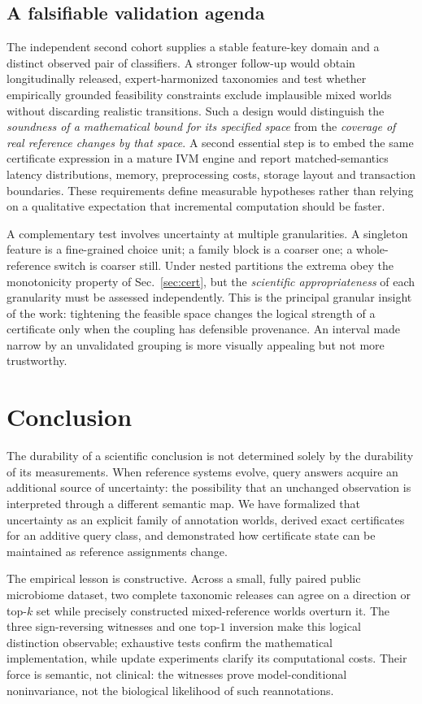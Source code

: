\documentclass[conference]{IEEEtran}
\begin{document}
\subsection{A falsifiable validation agenda}
The independent second cohort supplies a stable feature-key domain and a distinct observed pair of classifiers. A stronger follow-up would obtain longitudinally released, expert-harmonized taxonomies and test whether empirically grounded feasibility constraints exclude implausible mixed worlds without discarding realistic transitions. Such a design would distinguish the \emph{soundness of a mathematical bound for its specified space} from the \emph{coverage of real reference changes by that space}. A second essential step is to embed the same certificate expression in a mature IVM engine and report matched-semantics latency distributions, memory, preprocessing costs, storage layout and transaction boundaries. These requirements define measurable hypotheses rather than relying on a qualitative expectation that incremental computation should be faster.

A complementary test involves uncertainty at multiple granularities. A singleton feature is a fine-grained choice unit; a family block is a coarser one; a whole-reference switch is coarser still. Under nested partitions the extrema obey the monotonicity property of Sec.~\ref{sec:cert}, but the \emph{scientific appropriateness} of each granularity must be assessed independently. This is the principal granular insight of the work: tightening the feasible space changes the logical strength of a certificate only when the coupling has defensible provenance. An interval made narrow by an unvalidated grouping is more visually appealing but not more trustworthy.

\section{Conclusion}
The durability of a scientific conclusion is not determined solely by the durability of its measurements. When reference systems evolve, query answers acquire an additional source of uncertainty: the possibility that an unchanged observation is interpreted through a different semantic map. We have formalized that uncertainty as an explicit family of annotation worlds, derived exact certificates for an additive query class, and demonstrated how certificate state can be maintained as reference assignments change.

The empirical lesson is constructive. Across a small, fully paired public microbiome dataset, two complete taxonomic releases can agree on a direction or top-$k$ set while precisely constructed mixed-reference worlds overturn it. The three sign-reversing witnesses and one top-$1$ inversion make this logical distinction observable; exhaustive tests confirm the mathematical implementation, while update experiments clarify its computational costs. Their force is semantic, not clinical: the witnesses prove model-conditional noninvariance, not the biological likelihood of such reannotations.
\end{document}
